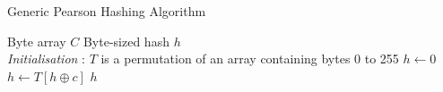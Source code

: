 \documentclass[conference]{IEEEtran}
\begin{document}
\begin{algorithm}[H]
\caption{Generic Pearson Hashing Algorithm}
\begin{algorithmic}[1]
\REQUIRE Byte array $C$
\ENSURE Byte-sized hash $h$
\\ \textit{Initialisation} : $T$ is a permutation of an array containing bytes 0 to 255
\STATE $h \gets 0$
\STATE $h \gets T[h \oplus c]$
\ENDFOR
\RETURN $h$
\end{algorithmic}
\label{pearson}
\end{algorithm}
\end{document}
